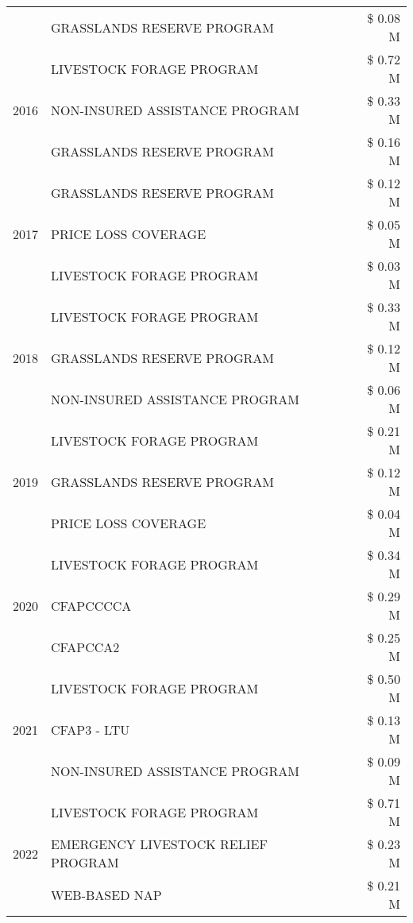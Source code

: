 \begin{tabular}{llr}
 & GRASSLANDS RESERVE PROGRAM & \$ 0.08 M \\
\cline{1-3}
\multirow[t]{3}{*}{2016} & LIVESTOCK FORAGE PROGRAM & \$ 0.72 M \\
 & NON-INSURED ASSISTANCE PROGRAM & \$ 0.33 M \\
 & GRASSLANDS RESERVE PROGRAM & \$ 0.16 M \\
\cline{1-3}
\multirow[t]{3}{*}{2017} & GRASSLANDS RESERVE PROGRAM & \$ 0.12 M \\
 & PRICE LOSS COVERAGE & \$ 0.05 M \\
 & LIVESTOCK FORAGE PROGRAM & \$ 0.03 M \\
\cline{1-3}
\multirow[t]{3}{*}{2018} & LIVESTOCK FORAGE PROGRAM & \$ 0.33 M \\
 & GRASSLANDS RESERVE PROGRAM & \$ 0.12 M \\
 & NON-INSURED ASSISTANCE PROGRAM & \$ 0.06 M \\
\cline{1-3}
\multirow[t]{3}{*}{2019} & LIVESTOCK FORAGE PROGRAM & \$ 0.21 M \\
 & GRASSLANDS RESERVE PROGRAM & \$ 0.12 M \\
 & PRICE LOSS COVERAGE & \$ 0.04 M \\
\cline{1-3}
\multirow[t]{3}{*}{2020} & LIVESTOCK FORAGE PROGRAM & \$ 0.34 M \\
 & CFAPCCCCA & \$ 0.29 M \\
 & CFAPCCA2 & \$ 0.25 M \\
\cline{1-3}
\multirow[t]{3}{*}{2021} & LIVESTOCK FORAGE PROGRAM & \$ 0.50 M \\
 & CFAP3 - LTU & \$ 0.13 M \\
 & NON-INSURED ASSISTANCE PROGRAM & \$ 0.09 M \\
\cline{1-3}
\multirow[t]{3}{*}{2022} & LIVESTOCK FORAGE PROGRAM & \$ 0.71 M \\
 & EMERGENCY LIVESTOCK RELIEF PROGRAM & \$ 0.23 M \\
 & WEB-BASED NAP & \$ 0.21 M \\
\cline{1-3}
\bottomrule
\end{tabular}
